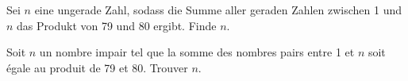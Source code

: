 Sei $n$ eine ungerade Zahl, sodass die Summe aller geraden Zahlen zwischen 1 und $n$ das Produkt von 79 und 80 ergibt. Finde $n$.

\bigskip

Soit $n$ un nombre impair tel que la somme des nombres pairs entre 1 et $n$ soit égale au produit de 79 et 80. Trouver $n$.
